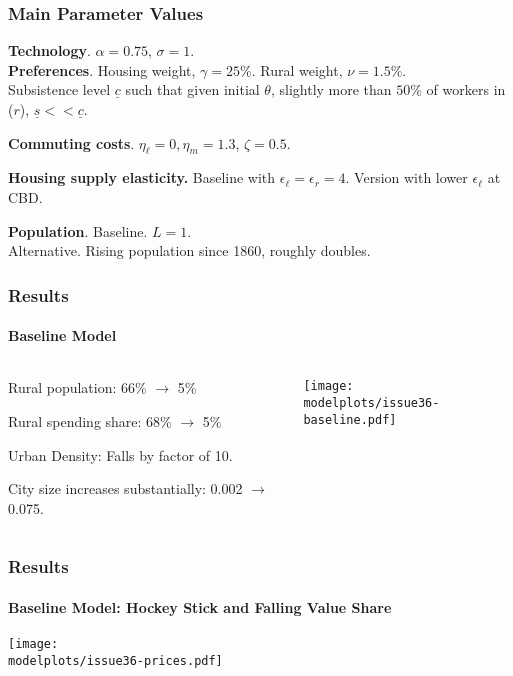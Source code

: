 \documentclass[aspectratio=169]{beamer}
\begin{document}
\begin{frame}
\frametitle{Main Parameter Values}

\noindent \textbf{Technology}. $\alpha=0.75$, $\sigma=1$.\\
\medskip
\noindent \textbf{Preferences}. Housing weight, $\gamma=25\%$. Rural weight, $\nu=1.5\%$.\\
Subsistence level $\underline{c}$ such that given initial $\theta$, slightly more than $50\%$ of workers in ($r$), $\underline{s} << \underline{c}$.

\medskip
\noindent \textbf{Commuting costs}. $\eta_\ell=0, \eta_m=1.3$, $\zeta = 0.5$.

\medskip
\noindent \textbf{Housing supply elasticity.} Baseline with $\epsilon_{\ell} = \epsilon_r=4$. Version with lower $\epsilon_{\ell}$ at CBD.

\medskip
\noindent \textbf{Population}. Baseline. $L=1$.\\
Alternative. Rising population since 1860, roughly doubles.
\end{frame}

\begin{frame}[label=res_laborland]
\frametitle{Results}
\framesubtitle{Baseline Model}

\begin{columns}
\begin{column}{0.3\textwidth}
\begin{mide}
\item Rural population: 66\% $\rightarrow$ 5\%
\item Rural spending share: 68\% $\rightarrow$ 5\%
\item Urban Density: Falls by factor of 10.
\item City size increases substantially: 0.002 $\rightarrow$ 0.075.
\end{mide}
\end{column}
\begin{column}{0.7\textwidth}
\begin{adjustbox}{center}
\texttt{[image: \\modelplots/issue36-baseline.pdf]}\end{adjustbox}
\end{column}\end{columns}
\end{frame}

\begin{frame}
\frametitle{Results}
\framesubtitle{Baseline Model: Hockey Stick and Falling Value Share}

\begin{adjustbox}{center}
\texttt{[image: \\modelplots/issue36-prices.pdf]}
\end{adjustbox}

\end{frame}
\end{document}
